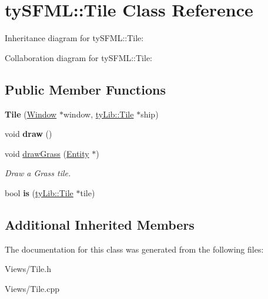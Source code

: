 \hypertarget{classty_s_f_m_l_1_1_tile}{}\section{ty\+S\+F\+M\+L\+:\+:Tile Class Reference}
\label{classty_s_f_m_l_1_1_tile}


Inheritance diagram for ty\+S\+F\+M\+L\+:\+:Tile\+:


Collaboration diagram for ty\+S\+F\+M\+L\+:\+:Tile\+:
\subsection*{Public Member Functions}
\begin{DoxyCompactItemize}
\item 
\hypertarget{classty_s_f_m_l_1_1_tile_a0feb287c7dd76def53ffd82c3969102d}{}{\bfseries Tile} (\hyperlink{classty_s_f_m_l_1_1_window}{Window} $\ast$window, \hyperlink{classty_lib_1_1_tile}{ty\+Lib\+::\+Tile} $\ast$ship)\label{classty_s_f_m_l_1_1_tile_a0feb287c7dd76def53ffd82c3969102d}

\item 
\hypertarget{classty_s_f_m_l_1_1_tile_a7429836c472fb2732c9b6de2e8d21895}{}void {\bfseries draw} ()\label{classty_s_f_m_l_1_1_tile_a7429836c472fb2732c9b6de2e8d21895}

\item 
\hypertarget{classty_s_f_m_l_1_1_tile_a594b281105c4be8c4dabe42fb7aba828}{}void \hyperlink{classty_s_f_m_l_1_1_tile_a594b281105c4be8c4dabe42fb7aba828}{draw\+Grass} (\hyperlink{classty_lib_1_1te_1_1_entity}{Entity} $\ast$)\label{classty_s_f_m_l_1_1_tile_a594b281105c4be8c4dabe42fb7aba828}

\begin{DoxyCompactList}\small\item\em Draw a Grass tile. \end{DoxyCompactList}\item 
\hypertarget{classty_s_f_m_l_1_1_tile_af1bf5c986266268f70f8cddd5c74fe5f}{}bool {\bfseries is} (\hyperlink{classty_lib_1_1_tile}{ty\+Lib\+::\+Tile} $\ast$tile)\label{classty_s_f_m_l_1_1_tile_af1bf5c986266268f70f8cddd5c74fe5f}

\end{DoxyCompactItemize}
\subsection*{Additional Inherited Members}


The documentation for this class was generated from the following files\+:\begin{DoxyCompactItemize}
\item 
Views/Tile.\+h\item 
Views/Tile.\+cpp\end{DoxyCompactItemize}

